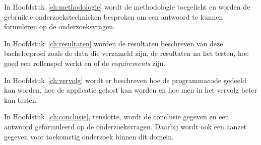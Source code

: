 In Hoofdstuk~\ref{ch:methodologie} wordt de methodologie toegelicht en worden de gebruikte onderzoekstechnieken besproken om een antwoord te kunnen formuleren op de onderzoeksvragen.

In Hoofdstuk~\ref{ch:resultaten} worden de resultaten beschreven van deze bachelorproef zoals de data die verzameld zijn, de resultaten na het testen, hoe goed een rollenspel werkt en of de \textit{requirements} zijn.

In Hoofdstuk~\ref{ch:vervolg} wordt er beschreven hoe de programmacode gedeeld kan worden, hoe de applicatie gehost kan worden en hoe men in het vervolg beter kan testen.


In Hoofdstuk~\ref{ch:conclusie}, tenslotte, wordt de conclusie gegeven en een antwoord geformuleerd op de onderzoeksvragen. Daarbij wordt ook een aanzet gegeven voor toekomstig onderzoek binnen dit domein.